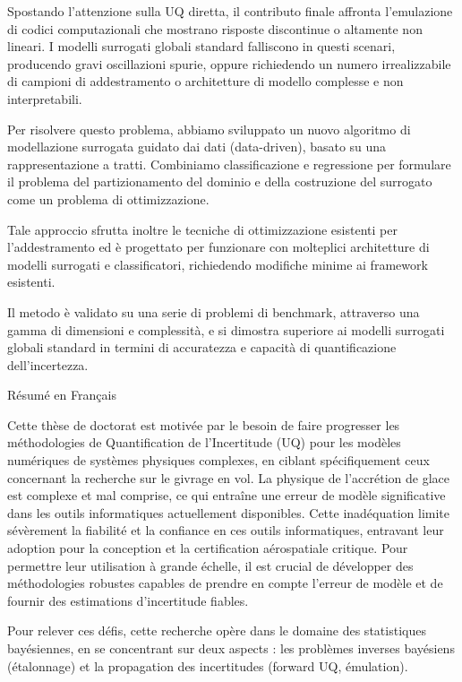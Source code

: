 \smallskip
Spostando l'attenzione sulla UQ diretta, il contributo finale affronta l'emulazione di codici computazionali che mostrano risposte discontinue o altamente non lineari. I modelli surrogati globali standard falliscono in questi scenari, producendo gravi oscillazioni spurie, oppure richiedendo un numero irrealizzabile di campioni di addestramento o architetture di modello complesse e non interpretabili.

Per risolvere questo problema, abbiamo sviluppato un nuovo algoritmo di modellazione surrogata guidato dai dati (data-driven), basato su una rappresentazione a tratti. Combiniamo classificazione e regressione per formulare il problema del partizionamento del dominio e della costruzione del surrogato come un problema di ottimizzazione. 

Tale approccio sfrutta inoltre le tecniche di ottimizzazione esistenti per l'addestramento ed \`e progettato per funzionare con molteplici architetture di modelli surrogati e classificatori, richiedendo modifiche minime ai framework esistenti.

Il metodo \`e validato su una serie di problemi di benchmark, attraverso una gamma di dimensioni e complessit\`a, e si dimostra superiore ai modelli surrogati globali standard in termini di accuratezza e capacit\`a di quantificazione dell'incertezza.


\bigskip
{ R\'esum\'e en Fran\c{c}ais}
\label{sec:abstract-fr}

Cette th\`ese de doctorat est motiv\'ee par le besoin de faire progresser les m\'ethodologies de Quantification de l'Incertitude (UQ) pour les mod\`eles num\'eriques de syst\`emes physiques complexes, en ciblant sp\'ecifiquement ceux concernant la recherche sur le givrage en vol. La physique de l'accr\'etion de glace est complexe et mal comprise, ce qui entra\^ine une erreur de mod\`ele significative dans les outils informatiques actuellement disponibles. Cette inad\'equation limite s\'ev\`erement la fiabilit\'e et la confiance en ces outils informatiques, entravant leur adoption pour la conception et la certification a\'erospatiale critique. Pour permettre leur utilisation \`a grande \'echelle, il est crucial de d\'evelopper des m\'ethodologies robustes capables de prendre en compte l'erreur de mod\`ele et de fournir des estimations d'incertitude fiables.

\smallskip
Pour relever ces d\'efis, cette recherche op\`ere dans le domaine des statistiques bay\'esiennes, en se concentrant sur deux aspects : les probl\`emes inverses bay\'esiens (\'etalonnage) et la propagation des incertitudes (forward UQ, \'emulation).

